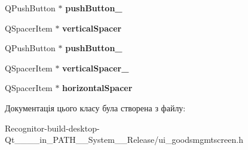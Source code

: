 \begin{DoxyCompactItemize}
\item 
\hypertarget{classUi__GoodsMgmtScreen_a143f19e6819b8639551e7fdedfe9315a}{Q\-Push\-Button $\ast$ {\bfseries push\-Button\-\_}}\label{classUi__GoodsMgmtScreen_a143f19e6819b8639551e7fdedfe9315a}

\item 
\hypertarget{classUi__GoodsMgmtScreen_a9de54f6ad441882ad31ca2f7e4dd7f15}{Q\-Spacer\-Item $\ast$ {\bfseries vertical\-Spacer}}\label{classUi__GoodsMgmtScreen_a9de54f6ad441882ad31ca2f7e4dd7f15}

\item 
\hypertarget{classUi__GoodsMgmtScreen_a4fdb4cd4f55d1eb13e5a519bbf25e8ad}{Q\-Push\-Button $\ast$ {\bfseries push\-Button\-\_}}\label{classUi__GoodsMgmtScreen_a4fdb4cd4f55d1eb13e5a519bbf25e8ad}

\item 
\hypertarget{classUi__GoodsMgmtScreen_a75b506a8fe8ba65608a4c51a4c85ed7a}{Q\-Spacer\-Item $\ast$ {\bfseries vertical\-Spacer\-\_}}\label{classUi__GoodsMgmtScreen_a75b506a8fe8ba65608a4c51a4c85ed7a}

\item 
\hypertarget{classUi__GoodsMgmtScreen_ab0075d4978b1995b8221c7f4bf6f087c}{Q\-Spacer\-Item $\ast$ {\bfseries horizontal\-Spacer}}\label{classUi__GoodsMgmtScreen_ab0075d4978b1995b8221c7f4bf6f087c}

\end{DoxyCompactItemize}


Документація цього класу була створена з файлу\-:\begin{DoxyCompactItemize}
\item 
Recognitor-\/build-\/desktop-\/\-Qt\-\_\-\_\-\_\-\_\-in\-\_\-\-P\-A\-T\-H\-\_\-\-\_\-\-System\-\_\-\-\_\-\-Release/ui\-\_\-goodsmgmtscreen.\-h\end{DoxyCompactItemize}

